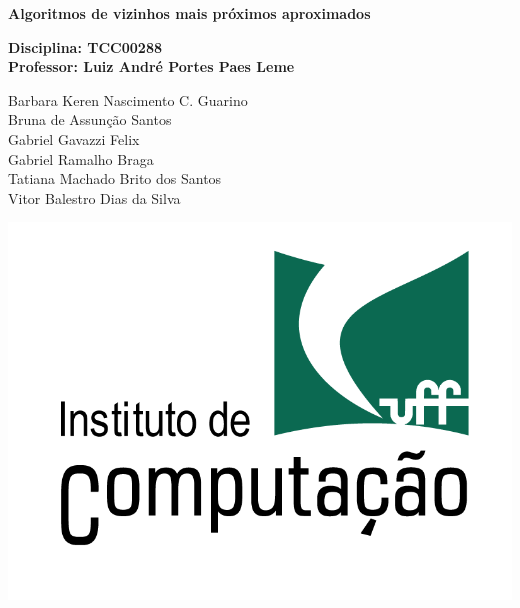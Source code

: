 \documentclass[a4paper,12pt,titlepage]{scrartcl}
\begin{document}
\newcommand{\wk}{\mbox{$\,<$\hspace{-5pt}\footnotesize )$\,$}}




\newtheorem{teo}{Theorem}
\newtheorem{lemma}{Lemma}

\newtheorem{coro}{Corollary}
\newtheorem{prop}{Proposition}
\theoremstyle{definition}
\newtheorem{definition}{Definition}
\theoremstyle{remark}
\newtheorem{remark}{Observação}

\newtheorem{scho}{Scholium}
\newtheorem{open}{Question}
\newtheorem{example}{Example}



\begin{titlepage}
\begin{center}
\vspace*{1cm}
\textbf{\large Algoritmos de vizinhos mais próximos aproximados}\\
\vspace*{2cm}

\end{center}
\textbf{Disciplina: TCC00288}\\
\textbf{Professor: Luiz André Portes Paes Leme}
\begin{center}
\vspace*{6cm}
Barbara Keren Nascimento C. Guarino \\
Bruna de Assunção Santos\\
Gabriel Gavazzi Felix\\
Gabriel Ramalho Braga \\
Tatiana Machado Brito dos Santos\\
Vitor Balestro Dias da Silva

\vspace*{6cm}

\includegraphics[scale=0.2]{logo.png}

\end{center}
\end{titlepage}
\end{document}
